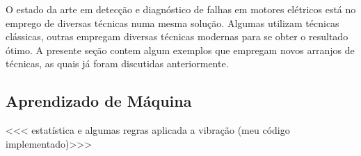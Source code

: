 O estado da arte em detecção e diagnóstico de falhas em motores elétricos está no emprego de diversas técnicas numa mesma solução. Algumas 
utilizam técnicas clássicas, outras empregam diversas técnicas modernas para se obter o resultado ótimo. A presente seção contem
algum exemplos que empregam novos arranjos de técnicas, as quais já foram discutidas anteriormente.


% 

\subsection{Aprendizado de Máquina}


<<< estatística e algumas regras aplicada a vibração (meu código implementado)>>>
